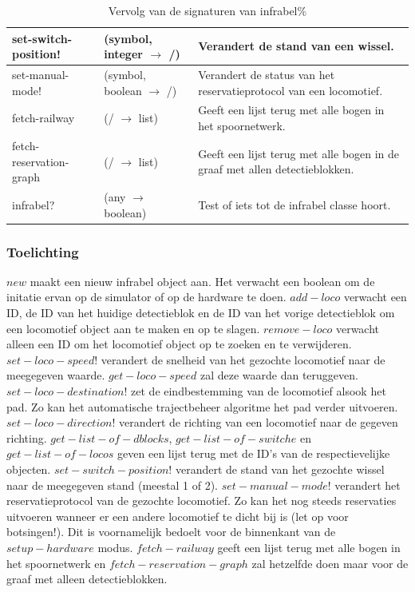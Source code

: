 \documentclass{article}
\begin{document}
\begin{table}[h!]
        \centering
        \begin{tabular}{|p{2.9cm}|p{4cm}|p{6.1cm}|}
                \hline
                set-switch-position! & (symbol, integer $\rightarrow$ /) & Verandert de stand van een wissel.\\
                \hline
                set-manual-mode! & (symbol, boolean $\rightarrow$ /) & Verandert de status van het reservatieprotocol van een locomotief.\\
                \hline
                fetch-railway & (/ $\rightarrow$ list) & Geeft een lijst terug met alle bogen in het spoornetwerk.\\
                \hline
                fetch-reservation-graph & (/ $\rightarrow$ list) & Geeft een lijst terug met alle bogen in de graaf met allen detectieblokken.\\
                \hline
                infrabel? & (any $\rightarrow$ boolean) & Test of iets tot de infrabel classe hoort.\\
                \hline
        \end{tabular}
        \caption{Vervolg van de signaturen van infrabel\%}
\end{table}
\subsubsection{Toelichting}
$new$ maakt een nieuw infrabel object aan. Het verwacht een boolean om de initatie ervan op de simulator of op de hardware te doen. $add-loco$ verwacht een ID, de ID van het huidige detectieblok en de ID van het vorige detectieblok
om een locomotief object aan te maken en op te slagen. $remove-loco$ verwacht alleen een ID om het locomotief object op te zoeken en te verwijderen. $set-loco-speed!$ verandert de snelheid van het gezochte locomotief naar de meegegeven waarde.
$get-loco-speed$ zal deze waarde dan teruggeven. $set-loco-destination!$ zet de eindbestemming van de locomotief alsook het pad. Zo kan het automatische trajectbeheer algoritme het pad verder uitvoeren. $set-loco-direction!$ verandert de richting van een locomotief naar de gegeven richting. 
$get-list-of-dblocks$, $get-list-of-switche$ en $get-list-of-locos$ geven een lijst terug met de ID's van de respectievelijke objecten. $set-switch-position!$ verandert de stand van het gezochte wissel naar de meegegeven stand (meestal 1 of 2). 
$set-manual-mode!$ verandert het reservatieprotocol van de gezochte locomotief. Zo kan het nog steeds reservaties uitvoeren wanneer er een
andere locomotief te dicht bij is (let op voor botsingen!). Dit is voornamelijk bedoelt voor de binnenkant van de $setup-hardware$ modus. $fetch-railway$ geeft een lijst terug met alle bogen in het spoornetwerk en $fetch-reservation-graph$ zal hetzelfde doen
maar voor de graaf met alleen detectieblokken. 
\end{document}
